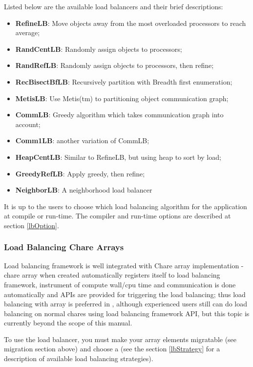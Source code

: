 Listed below are the available load balancers and their brief 
descriptions:
\begin{itemize}
\item {\bf RefineLB}:     Move objects away from the most overloaded processors to reach average;
\item {\bf RandCentLB}:   Randomly assign objects to processors;
\item {\bf RandRefLB}:    Randomly assign objects to processors, then refine;
\item {\bf RecBisectBfLB}:        Recursively partition with Breadth first enumeration;
\item {\bf MetisLB}:      Use Metis(tm) to partitioning object communication graph;
\item {\bf CommLB}:       Greedy algorithm which takes communication graph into account;
\item {\bf Comm1LB}:      another variation of CommLB;
\item {\bf HeapCentLB}:   Similar to RefineLB, but using heap to sort by load;
\item {\bf GreedyRefLB}:  Apply greedy, then refine;
\item {\bf NeighborLB}:   A neighborhood load balancer
\end{itemize}

It is up to the users to choose which load balancing algorithm for the
application at compile or run-time. The compiler and run-time options
are described at section \ref{lbOption}.

\subsubsection{Load Balancing Chare Arrays}
\label{lbarray}

Load balancing framework is well integrated with Chare array implementation - 
chare array when created automatically registers itself to load balancing
framework, instrument of compute wall/cpu time and communication is 
done automatically and APIs are provided for triggering the load balancing; 
thus load balancing with array is preferred in \charmpp{}, although 
experienced users still can do load balancing on normal chares using load 
balancing framework API, but this topic is currently beyond the scope of 
this manual.

To use the load balancer, you must make your array elements migratable
(see migration section above) and choose a  
(see the section \ref{lbStrategy} for a description
of available load balancing strategies).

